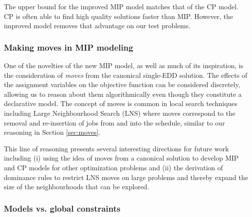 \documentclass[oribibl]{llncs}
\begin{document}


The upper bound for the improved MIP model matches that of the CP model.
CP is often able to find high quality solutions faster than MIP. However, the improved model removes that
advantage on our test problems.

\subsubsection{Making moves in MIP modeling}

One of the novelties of the new MIP model, as well as much of its
inspiration, is the consideration of \textit{moves} from the canonical
single-EDD solution. The effects of the assignment variables on the
objective function can be considered discretely, allowing us to reason
about them algorithmically even though they constitute a
declarative model.  The concept of moves is common in local
search techniques including Large Neighbourhood Search (LNS) \cite{shaw}
where moves correspond to the removal and re-insertion of jobs from
and into the schedule, similar to our reasoning in Section
\ref{sec:moves}.  

This line of reasoning presents several interesting directions for future work including (i) using the idea of moves from a canonical solution to develop MIP and CP models for other optimization problems and (ii) the derivation of dominance rules to restrict LNS moves on large problems and thereby expand the size of the neighbourhoods that can be explored.


\subsubsection{Models vs. global constraints}
\end{document}
